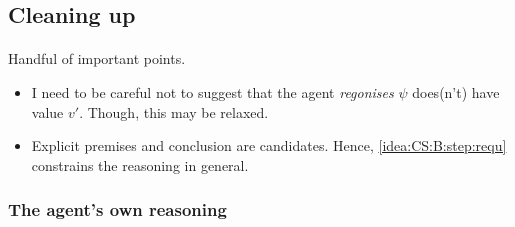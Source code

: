 \subsection{Cleaning up}
\label{sec:cleaning-up}

\paragraph{\ideaCS{}}

\begin{note}
  Handful of important points.
  \begin{itemize}
  \item I need to be careful not to suggest that the agent \emph{regonises} \(\psi\) does(n't) have value \(v'\).
    Though, this may be relaxed.
  \item Explicit premises and conclusion are candidates.
  Hence, \ref{idea:CS:B:step:requ} constrains the reasoning in general.
  \end{itemize}
\end{note}

\subsubsection{The agent's own reasoning}
\label{sec:agents-own-reasoning}

